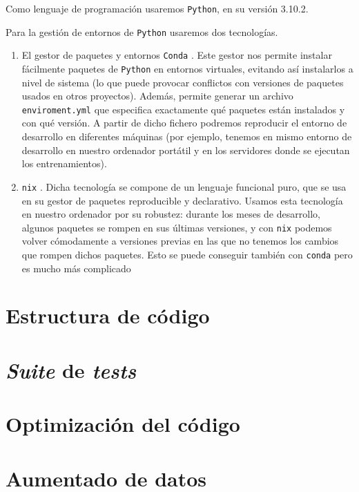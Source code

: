 Como lenguaje de programación usaremos \lstinline{Python}, en su versión 3.10.2.

Para la gestión de entornos de \lstinline{Python} usaremos dos tecnologías.

\begin{enumerate}
    \item El gestor de paquetes y entornos \lstinline{Conda} \cite{informatica:conda_web}. Este gestor nos permite instalar fácilmente paquetes de \lstinline{Python} en entornos virtuales, evitando así instalarlos a nivel de sistema (lo que puede provocar conflictos con versiones de paquetes usados en otros proyectos). Además, permite generar un archivo \lstinline{enviroment.yml} que especifica exactamente qué paquetes están instalados y con qué versión. A partir de dicho fichero podremos reproducir el entorno de desarrollo en diferentes máquinas (por ejemplo, tenemos en mismo entorno de desarrollo en nuestro ordenador portátil y en los servidores donde se ejecutan los entrenamientos).
    \item \lstinline{nix} \cite{informatica:nixos_web}. Dicha tecnología se compone de un lenguaje funcional puro, que se usa en su gestor de paquetes reproducible y declarativo. Usamos esta tecnología en nuestro ordenador por su robustez: durante los meses de desarrollo, algunos paquetes se rompen en sus últimas versiones, y con \lstinline{nix} podemos volver cómodamente a versiones previas en las que no tenemos los cambios que rompen dichos paquetes. Esto se puede conseguir también con \lstinline{conda} pero es mucho más complicado
\end{enumerate}


\section{Estructura de código}



\section{\textit{Suite} de \textit{tests}} \label{isec:test_suite}

\section{Optimización del código} \label{isec:optimizacion_codigo}

\section{Aumentado de datos} \label{isec:aumentado_datos}

